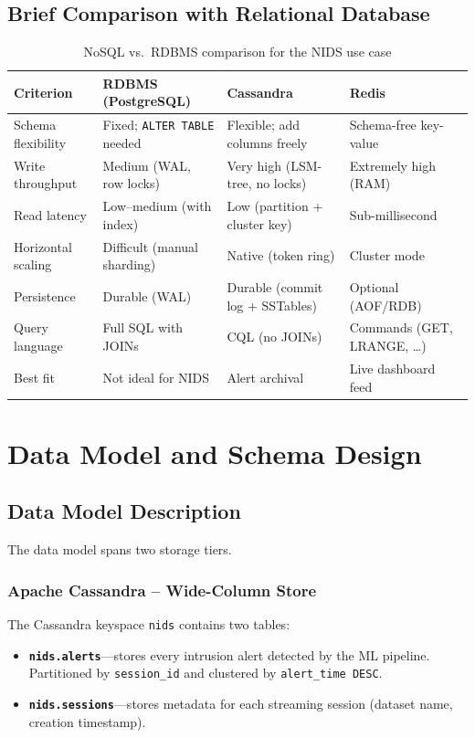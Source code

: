 \documentclass[12pt,a4paper]{report}
\begin{document}
\section{Brief Comparison with Relational Database}
\begin{table}[H]
  \centering
  \caption{NoSQL vs.\ RDBMS comparison for the NIDS use case}
  \label{tab:nosql-vs-rdbms}
  \begin{tabularx}{\textwidth}{lXXX}
    \toprule
    \textbf{Criterion} & \textbf{RDBMS (PostgreSQL)} &
    \textbf{Cassandra} & \textbf{Redis} \\
    \midrule
    Schema flexibility  & Fixed; \texttt{ALTER TABLE} needed &
    Flexible; add columns freely & Schema-free key-value \\
    Write throughput    & Medium (WAL, row locks) &
    Very high (LSM-tree, no locks) & Extremely high (RAM) \\
    Read latency        & Low--medium (with index) &
    Low (partition + cluster key) & Sub-millisecond \\
    Horizontal scaling  & Difficult (manual sharding) &
    Native (token ring) & Cluster mode \\
    Persistence         & Durable (WAL) &
    Durable (commit log + SSTables) & Optional (AOF/RDB) \\
    Query language      & Full SQL with JOINs &
    CQL (no JOINs) & Commands (GET, LRANGE, \ldots) \\
    Best fit            & Not ideal for NIDS &
    Alert archival & Live dashboard feed \\
    \bottomrule
  \end{tabularx}
\end{table}

\chapter{Data Model and Schema Design}

\section{Data Model Description}
The data model spans two storage tiers.

\subsection{Apache Cassandra -- Wide-Column Store}
The Cassandra keyspace \texttt{nids} contains two tables:
\begin{itemize}
  \item \textbf{\texttt{nids.alerts}}---stores every intrusion alert detected
        by the ML pipeline.  Partitioned by \texttt{session\_id} and
        clustered by \texttt{alert\_time DESC}.
  \item \textbf{\texttt{nids.sessions}}---stores metadata for each streaming
        session (dataset name, creation timestamp).
\end{itemize}
\end{document}
